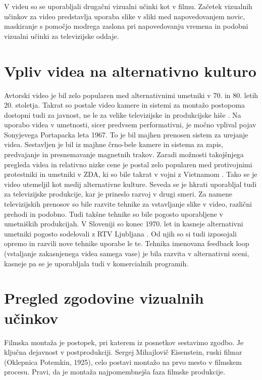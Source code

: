 \documentclass[a4paper, 12pt]{book}
\begin{document}
V videu so se uporabljali drugačni vizualni učinki kot v filmu.
Začetek vizualnih učinkov za video predstavlja uporaba slike v sliki med napovedovanjem novic, maskiranje s pomočjo modrega zaslona pri napovedovanju vremena in podobni vizualni učinki za televizijske oddaje.



\section{Vpliv videa na alternativno kulturo}

Avtorski video je bil zelo popularen med alternativnimi umetniki v 70. in 80. letih 20. stoletja.
Takrat so postale video kamere in sistemi za montažo postopoma dostopni tudi za javnost, ne le za velike televizijske in produkcijske hiše \cite{rekonFikc}.
Na uporabo videa v umetnosti, sicer predvsem performativni, je močno vplival pojav Sonyjevega Portapacka leta 1967.
To je bil majhen prenosen sistem za urejanje videa. 
Sestavljen je bil iz majhne črno-bele kamere in sistema za zapis, predvajanje in presnemavanje magnetnih trakov.
Zaradi možnosti takojšnjega pregleda videa in relativno nizke cene je postal zelo popularen med protivojnimi protestniki in umetniki v ZDA, ki so bile takrat v vojni z Vietnamom \cite{videosfera1}.
Tako se je video utemeljil kot medij alternativne kulture.
Seveda se je hkrati uporabljal tudi za televizijske produkcije, kar je prineslo razvoj v drugi smeri.
Za namene televizijskih prenosov so bile razvite tehnike za vstavljanje slike v video, različni prehodi in podobno.
Tudi takšne tehnike so bile pogosto uporabljene v umetniških produkcijah.
V Sloveniji so konec 1970. let in kasneje alternativni umetniki pogosto sodelovali z RTV Ljubljana \cite{tugoslavija}.
Od njih so si tudi izposojali opremo in razvili nove tehnike uporabe le te.
Tehnika imenovana feedback loop (vstaljanje zakasnjenega  videa samega vase) je bila razvita v alternativni sceni, kasneje pa se je uporabljala tudi v komercialnih programih.




\section{Pregled zgodovine vizualnih učinkov}

Filmska montaža je postopek, pri katerem iz posnetkov sestavimo zgodbo. 
Je ključna dejavnost v postprodukciji. 
Sergej Mihajlovič Eisenstein, ruski filmar (Oklepnica Potemkin, 1925), celo postavi montažo na prvo mesto v filmskem procesu.
Pravi, da je montaža najpomembnejša faza filmske produkcije. 
\end{document}
